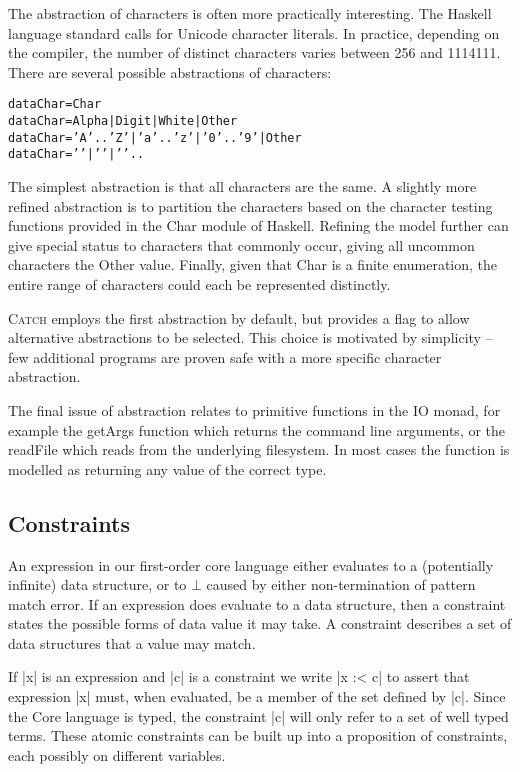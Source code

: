 \documentclass[preprint]{sigplanconf}
\newcommand{\C}[1]{\textsf{#1}}
\newcommand{\catch}{\textsc{Catch}}
\newenvironment{code}{\begin{alltt}\small}{\end{alltt}}
\begin{document}
The abstraction of characters is often more practically interesting. The Haskell language standard calls for Unicode character literals. In practice, depending on the compiler, the number of distinct characters varies between 256 and 1114111. There are several possible abstractions of characters:

\begin{code}
data Char = Char
data Char = Alpha | Digit | White | Other
data Char = 'A' .. 'Z' | 'a' .. 'z' | '0' .. '9' | Other
data Char = '\0' | '\1' | '\2' ..
\end{code}

The simplest abstraction is that all characters are the same. A slightly more refined abstraction is to partition the characters based on the character testing functions provided in the \C{Char} module of Haskell. Refining the model further can give special status to characters that commonly occur, giving all uncommon characters the \C{Other} value. Finally, given that \C{Char} is a finite enumeration, the entire range of characters could each be represented distinctly.

\catch{} employs the first abstraction by default, but provides a flag to allow alternative abstractions to be selected. This choice is motivated by simplicity -- few additional programs are proven safe with a more specific character abstraction.

The final issue of abstraction relates to primitive functions in the \C{IO} monad, for example the \C{getArgs} function which returns the command line arguments, or the \C{readFile} which reads from the underlying filesystem. In most cases the function is modelled as returning any value of the correct type.


\subsection{Constraints}

An expression in our first-order core language either evaluates to a (potentially infinite) data structure, or to $\bot{}$ caused by either non-termination of pattern match error. If an expression does evaluate to a data structure, then a constraint states the possible forms of data value it may take. A constraint describes a set of data structures that a value may match.

If |x| is an expression and |c| is a constraint we write |x :< c| to assert that expression |x| must, when evaluated, be a member of the set defined by |c|. Since the Core language is typed, the constraint |c| will only refer to a set of well typed terms. These atomic constraints can be built up into a proposition of constraints, each possibly on different variables.
\end{document}
